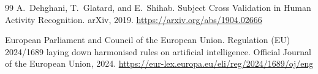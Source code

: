\documentclass[12pt,a4paper]{article}
\begin{document}
\begin{thebibliography}{99}
A.~Dehghani, T.~Glatard, and E.~Shihab.
\newblock Subject Cross Validation in Human Activity Recognition.
\newblock arXiv, 2019.
\newblock \url{https://arxiv.org/abs/1904.02666}

European Parliament and Council of the European Union.
\newblock Regulation (EU) 2024/1689 laying down harmonised rules on artificial intelligence.
\newblock Official Journal of the European Union, 2024.
\newblock \url{https://eur-lex.europa.eu/eli/reg/2024/1689/oj/eng}

\end{thebibliography}
\end{document}
